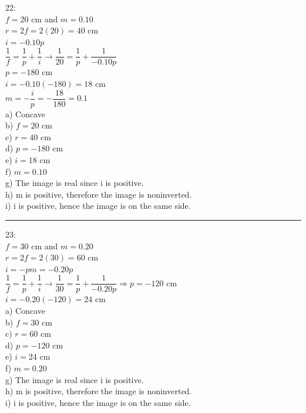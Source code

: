 \documentclass[fleqn]{article}
\begin{document}
\begin{enumerate}
    \textcolor{hwColor}{
      22: \\
      $f=20$ cm and $m=0.10$ \\
      $r=2f=2(20)=40$ cm \\
      $i=-0.10p$ \\
      $\dfrac{1}{f}=\dfrac{1}{p}+\dfrac{1}{i} \rightarrow \dfrac{1}{20}=\dfrac{1}{p}+\dfrac{1}{-0.10p}$ \\
      $p=-180$ cm \\
      $i=-0.10(-180)=18$ cm \\
      $m=-\dfrac{i}{p}=-\dfrac{18}{180}=0.1$ \\
      a) Concave \\
      b) $f=20$ cm \\
      c) $r=40$ cm \\
      d) $p=-180$ cm \\
      e) $i=18$ cm \\
      f) $m=0.10$ \\
      g) The image is real since i is positive. \\
      h) m is positive, therefore the image is noninverted. \\
      i) i is positive, hence the image is on the same side. \\
    }

    \textcolor{hwColor}{
      \rule{15cm}{0.4pt}
    }

    \textcolor{hwColor}{
      23: \\
      $f=30$ cm and $m=0.20$ \\
      $r=2f=2(30)=60$ cm \\
      $i=-pm=-0.20p$ \\
      $\dfrac{1}{f}=\dfrac{1}{p}+\dfrac{1}{i} \rightarrow \dfrac{1}{30}=\dfrac{1}{p}+\dfrac{1}{-0.20p} \Longrightarrow p=-120$ cm \\
      $i=-0.20(-120)=24$ cm \\
      a) Concave \\
      b) $f=30$ cm \\
      c) $r=60$ cm \\
      d) $p=-120$ cm \\
      e) $i=24$ cm \\
      f) $m=0.20$ \\
      g) The image is real since i is positive. \\
      h) m is positive, therefore the image is noninverted. \\
      i) i is positive, hence the image is on the same side. \\
    }


\end{enumerate}
\end{document}

